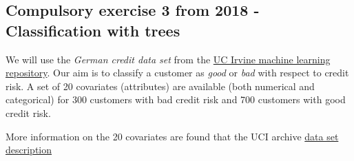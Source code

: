 \documentclass[]{article}
\newenvironment{Shaded}{\begin{snugshade}}{\end{snugshade}}
\newcommand{\KeywordTok}[1]{\textcolor[rgb]{0.13,0.29,0.53}{\textbf{#1}}}
\newcommand{\StringTok}[1]{\textcolor[rgb]{0.31,0.60,0.02}{#1}}
\newcommand{\CommentTok}[1]{\textcolor[rgb]{0.56,0.35,0.01}{\textit{#1}}}
\newcommand{\OperatorTok}[1]{\textcolor[rgb]{0.81,0.36,0.00}{\textbf{#1}}}
\newcommand{\NormalTok}[1]{#1}
\begin{document}
\subsection{Compulsory exercise 3 from 2018 - Classification with
trees}\label{compulsory-exercise-3-from-2018---classification-with-trees}

We will use the \emph{German credit data set} from the
\href{https://archive.ics.uci.edu/ml/index.php}{UC Irvine machine
learning repository}. Our aim is to classify a customer as \emph{good}
or \emph{bad} with respect to credit risk. A set of 20 covariates
(attributes) are available (both numerical and categorical) for 300
customers with bad credit risk and 700 customers with good credit risk.

More information on the 20 covariates are found that the UCI archive
\href{https://archive.ics.uci.edu/ml/datasets/Statlog+\%28German+Credit+Data\%29}{data
set description}

\begin{Shaded}
\end{Shaded}
\end{document}
